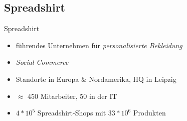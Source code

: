 \subsection{Spreadshirt}
\begin{frame}{Spreadshirt}
    \begin{itemize}
        \item führendes Unternehmen für \emph{personalisierte Bekleidung}
        \item \emph{Social-Commerce}
        \item Standorte in Europa \& Nordamerika, HQ in Leipzig
        \item $\approx$ 450 Mitarbeiter, 50 in der IT
        \item $4*10^5$ Spreadshirt-Shops mit $33*10^6$ Produkten
    \end{itemize}
\end{frame}
